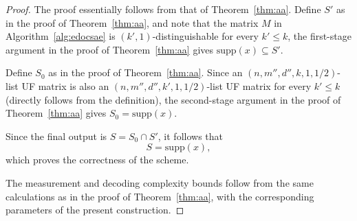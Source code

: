 \documentclass{article}
\newcommand{\supp}{\mathrm{supp}}
\begin{document}
\begin{proof}
The proof essentially follows from that of Theorem~\ref{thm:aa}. 
Define $S'$ as in the proof of Theorem~\ref{thm:aa}, and note that the matrix $M$ in Algorithm~\ref{alg:edocsae} is $(k',1)$-distinguishable for every $k'\leq k$, the first-stage argument in the proof of Theorem~\ref{thm:aa} gives
\(\supp(x)\subseteq S'.\)

Define $S_0$ as in the proof of Theorem~\ref{thm:aa}. Since an $(n,m'',d'',k,1,1/2)$-list UF matrix is also an $(n,m'',d'',k',1,1/2)$-list UF matrix for every $k'\leq k$ (directly follows from the definition), the second-stage argument in the proof of Theorem~\ref{thm:aa} gives
\(
S_0=\supp(x).
\)

Since the final output is $S=S_0\cap S'$, it follows that
\[
S=\supp(x),
\]
which proves the correctness of the scheme.

The measurement and decoding complexity bounds follow from the same calculations as in the proof of Theorem~\ref{thm:aa}, with the corresponding parameters of the present construction.
\end{proof}




\end{document}
